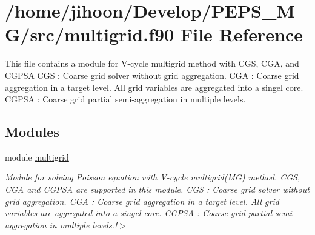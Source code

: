 \hypertarget{multigrid_8f90}{}\section{/home/jihoon/\+Develop/\+P\+E\+P\+S\+\_\+\+M\+G/src/multigrid.f90 File Reference}
\label{multigrid_8f90}


This file contains a module for V-\/cycle multigrid method with C\+GS, C\+GA, and C\+G\+P\+SA  C\+GS \+: Coarse grid solver without grid aggregation. C\+GA \+: Coarse grid aggregation in a target level. All grid variables are aggregated into a singel core. C\+G\+P\+SA \+: Coarse grid partial semi-\/aggregation in multiple levels.  


\subsection*{Modules}
\begin{DoxyCompactItemize}
\item 
module \hyperlink{namespacemultigrid}{multigrid}
\begin{DoxyCompactList}\small\item\em Module for solving Poisson equation with V-\/cycle multigrid(\+M\+G) method.  C\+GS, C\+GA and C\+G\+P\+SA are supported in this module. C\+GS \+: Coarse grid solver without grid aggregation. C\+GA \+: Coarse grid aggregation in a target level. All grid variables are aggregated into a singel core. C\+G\+P\+SA \+: Coarse grid partial semi-\/aggregation in multiple levels.!$>$ \end{DoxyCompactList}\end{DoxyCompactItemize}
